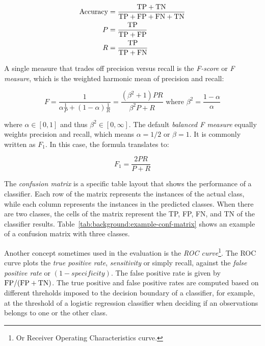 \begin{align}
    \text{Accuracy} &= \frac{\text{TP} + \text{TN}}{\text{TP} + \text{FP} + \text{FN} + \text{TN}} \\
    P &= \frac{\text{TP}}{\text{TP} + \text{FP}} \\
    R &= \frac{\text{TP}}{\text{TP} + \text{FN}} 
\end{align}

A single measure that trades off precision versus recall is the {\em F-score} or
{\em F measure}, which is the weighted harmonic mean of precision and recall:

\begin{equation}
    F = \frac{1}{\alpha\frac{1}{P} + (1-\alpha)\frac{1}{R}} = \frac{(\beta^2+1)PR}{\beta^2P+R} \text{\ \ where\ \ } \beta^2 = \frac{1-\alpha}{\alpha}
\end{equation}

where $\alpha \in [0, 1]$ and thus $\beta^2 \in [0, \infty]$. 
%
The default {\em balanced F measure} equally weights precision and recall, which
means $\alpha=1/2$ or $\beta=1$.
%
It is commonly written as $F_1$.
%
In this case, the formula translates to:

\begin{equation}
    F_1 = \frac{2PR}{P+R}
\end{equation}


The {\em confusion matrix} is a specific table layout that shows the performance
of a classifier.
%
Each row of the matrix represents the instances of the actual class, while each
column represents the instances in the predicted classes.
%
When there are two classes, the cells of the matrix represent the TP, FP, FN,
and TN of the classifier results.
%
Table~\ref{tab:background:example-conf-matrix} shows an example of a confusion
matrix with three classes.


Another concept sometimes used in the evaluation is the {\em ROC
curve}\footnote{Or Receiver Operating Characteristics curve.}. 
%
The ROC curve plots the {\em true positive rate}, {\em sensitivity} or simply
recall, against the {\em false positive rate} or $(1 - \mathit{specificity})$.
%
The false positive rate is given by $\text{FP}/(\text{FP} + \text{TN})$.
%
The true positive and false positive rates are computed based on different
threholds imposed to the decision boundary of a classifier, for example, at the
threshold of a logistic regression classifier when deciding if an observations
belongs to one or the other class.



